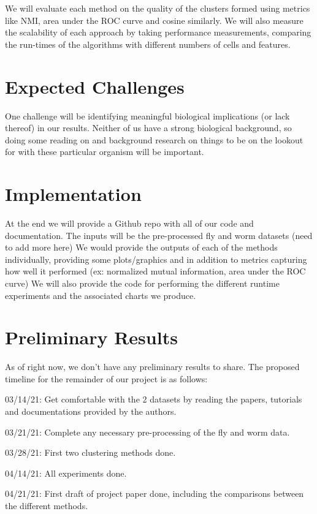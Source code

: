 \documentclass{article}
\begin{document}
We will evaluate each method on the quality of the clusters formed using metrics like NMI, area under the ROC curve and cosine similarly. We will also measure the scalability of each approach by taking performance measurements, comparing the run-times of the algorithms with different numbers of cells and features.

\section{Expected Challenges}
One challenge will be identifying meaningful biological implications (or lack thereof) in our results. Neither of us have a strong biological background, so doing some reading on and background research on things to be on the lookout for with these particular organism will be important. 

\section{Implementation}
At the end we will provide a Github repo with all of our code and documentation. The inputs will be the pre-processed fly and worm datasets (need to add more here) We would provide the outputs of each of the methods individually, providing some plots/graphics and in addition to metrics capturing how well it performed (ex: normalized mutual information, area under the ROC curve) We will also provide the code for performing the different runtime experiments and the associated charts we produce.

\section{Preliminary Results}
As of right now, we don't have any preliminary results to share. The proposed timeline for the remainder of our project is as follows:

03/14/21: Get comfortable with the 2 datasets by reading the papers, tutorials and documentations provided by the authors.

03/21/21: Complete any necessary pre-processing of the fly and worm data.

03/28/21: First two clustering methods done.

04/14/21: All experiments done.

04/21/21: First draft of project paper done, including the comparisons between the different methods.
\end{document}
